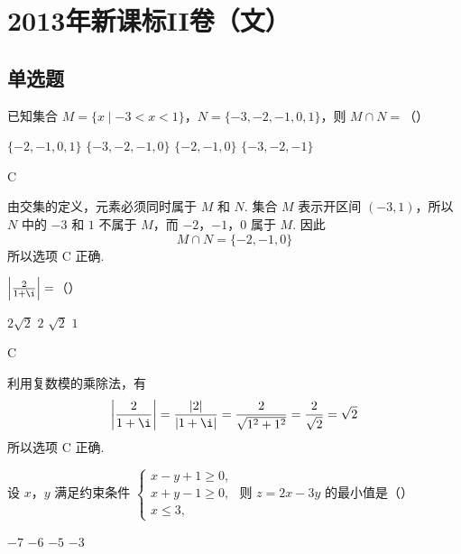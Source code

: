 \chapter{2013年新课标II卷（文）}

\section{单选题}

\begin{problem}
已知集合 \(M = \{x \mid -3 < x < 1\}\)，\(N = \{-3, -2, -1, 0, 1\}\)，则 \(M \cap N =\)（\quad）

\choices
    {\( \{-2,-1,0,1\} \)}
    {\( \{-3,-2,-1,0\} \)}
    {\( \{-2,-1,0\} \)}
    {\(\{-3, -2, -1\}\)}
\end{problem}

\begin{answer}
C
\end{answer}

\begin{solution}
由交集的定义，元素必须同时属于 \(M\) 和 \(N\). 集合 \(M\) 表示开区间 \((-3,1)\)，所以 \(N\) 中的 \(-3\) 和 \(1\) 不属于 \(M\)，而 \(-2\)，\(-1\)，\(0\) 属于 \(M\). 因此
\[
M\cap N=\{-2,-1,0\}
\]
所以选项 C 正确.
\end{solution}

\begin{problem}
\(\left|\frac{2}{1 + \i}\right| =\)（\quad）

\choices
    {\(2\sqrt{2}\)}
    {\(2\)}
    {\(\sqrt{2}\)}
    {\(1\)}
\end{problem}

\begin{answer}
C
\end{answer}

\begin{solution}
利用复数模的乘除法，有
\[
\left|\frac{2}{1+\i}\right|=\frac{|2|}{|1+\i|}=\frac{2}{\sqrt{1^2+1^2}}=\frac{2}{\sqrt{2}}=\sqrt{2}
\]
所以选项 C 正确.
\end{solution}

\begin{problem}
设 \(x\)，\(y\) 满足约束条件 \(\begin{cases}
x - y + 1 \geqslant 0,\\
x + y - 1 \geqslant 0,\\
x \leqslant 3,
\end{cases}\) 则 \(z = 2x - 3y\) 的最小值是（\quad）

\choices
    {\(-7\)}
    {\(-6\)}
    {\(-5\)}
    {\(-3\)}
\end{problem}

